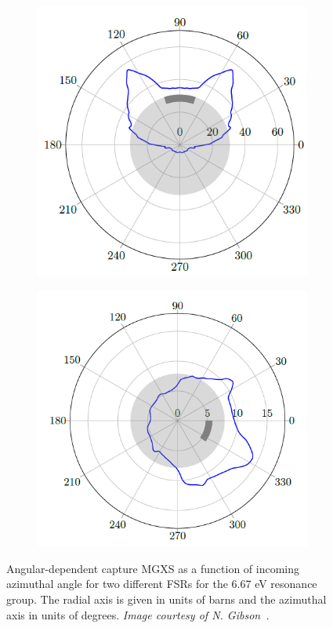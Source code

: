 \begin{figure}[h]
\begin{subfigure}{.5\textwidth}
  \centering
  \includegraphics[width=\linewidth]{figures/sph/batman-1}
  \caption{}
  \label{fig:chap6-batman-plots-a}
\end{subfigure}
\begin{subfigure}{.5\textwidth}
  \centering
  \includegraphics[width=\linewidth]{figures/sph/batman-2}
  \caption{}
  \label{fig:chap6-batman-plots-b}
\end{subfigure}
\caption[Angular-dependent capture MGXS]{Angular-dependent capture \ac{MGXS} as a function of incoming azimuthal angle for two different \ac{FSR}s for the 6.67 eV resonance group. The radial axis is given in units of barns and the azimuthal axis in units of degrees. \textit{Image courtesy of N. Gibson~\cite{gibson2016thesis}.}}
\label{fig:chap6-batman-plots}
\end{figure}


